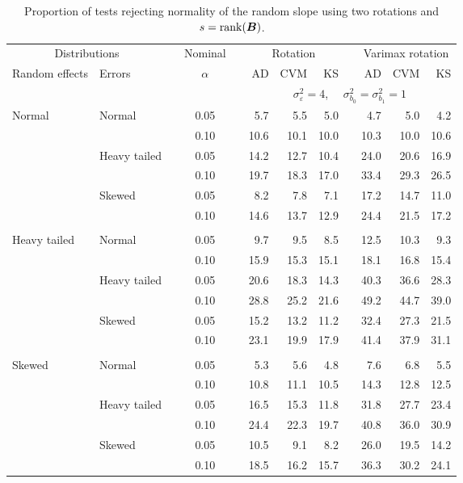 


\begin{table}[ht]
\centering
\caption{\label{tab:fixedsimb1sB} Proportion of tests rejecting normality of the random slope using two rotations and $s = \operatorname{rank}(\bm{B})$.}
\begin{scriptsize}
\begin{tabular}{ll p{.1cm} c p{.1cm} rrr p{.1cm} rrr}
  \hline
  \multicolumn{2}{c}{Distributions}& & Nominal & &  \multicolumn{3}{c}{Rotation} & & \multicolumn{3}{c}{Varimax rotation} \\ \cline{1-2} \cline{6-8} \cline{10-12}   
  Random effects & Errors & & $\alpha$ & & AD & CVM & KS & & AD & CVM & KS \\ 
   \hline
& && && \multicolumn{7}{c}{$\sigma_{\varepsilon}^2 = 4$, \ \ $\sigma_{b_0}^2 = \sigma_{b_1}^2 = 1$} \\ \cline{6-12}
\rowcolor{gray!20} Normal & Normal &  & 0.05 &  & 5.7 & 5.5 & 5.0 &  & 4.7 & 5.0 & 4.2 \\ 
\rowcolor{gray!20}    &  &  & 0.10 &  & 10.6 & 10.1 & 10.0 &  & 10.3 & 10.0 & 10.6 \\ 
\rowcolor{gray!20}    & Heavy tailed &  & 0.05 &  & 14.2 & 12.7 & 10.4 &  & 24.0 & 20.6 & 16.9 \\ 
\rowcolor{gray!20}    &  &  & 0.10 &  & 19.7 & 18.3 & 17.0 &  & 33.4 & 29.3 & 26.5 \\ 
\rowcolor{gray!20}    & Skewed &  & 0.05 &  & 8.2 & 7.8 & 7.1 &  & 17.2 & 14.7 & 11.0 \\ 
\rowcolor{gray!20}    &  &  & 0.10 &  & 14.6 & 13.7 & 12.9 &  & 24.4 & 21.5 & 17.2 \\ 
&&&&&&&&&&&\\
  Heavy tailed & Normal &  & 0.05 &  & 9.7 & 9.5 & 8.5 &  & 12.5 & 10.3 & 9.3 \\ 
   &  &  & 0.10 &  & 15.9 & 15.3 & 15.1 &  & 18.1 & 16.8 & 15.4 \\ 
   & Heavy tailed &  & 0.05 &  & 20.6 & 18.3 & 14.3 &  & 40.3 & 36.6 & 28.3 \\ 
   &  &  & 0.10 &  & 28.8 & 25.2 & 21.6 &  & 49.2 & 44.7 & 39.0 \\ 
   & Skewed &  & 0.05 &  & 15.2 & 13.2 & 11.2 &  & 32.4 & 27.3 & 21.5 \\ 
   &  &  & 0.10 &  & 23.1 & 19.9 & 17.9 &  & 41.4 & 37.9 & 31.1 \\ 
&&&&&&&&&&&\\
  Skewed & Normal &  & 0.05 &  & 5.3 & 5.6 & 4.8 &  & 7.6 & 6.8 & 5.5 \\ 
   &  &  & 0.10 &  & 10.8 & 11.1 & 10.5 &  & 14.3 & 12.8 & 12.5 \\ 
   & Heavy tailed &  & 0.05 &  & 16.5 & 15.3 & 11.8 &  & 31.8 & 27.7 & 23.4 \\ 
   &  &  & 0.10 &  & 24.4 & 22.3 & 19.7 &  & 40.8 & 36.0 & 30.9 \\ 
   & Skewed &  & 0.05 &  & 10.5 & 9.1 & 8.2 &  & 26.0 & 19.5 & 14.2 \\ 
   &  &  & 0.10 &  & 18.5 & 16.2 & 15.7 &  & 36.3 & 30.2 & 24.1 \\ 


\end{tabular}
\end{scriptsize}
\end{table}
